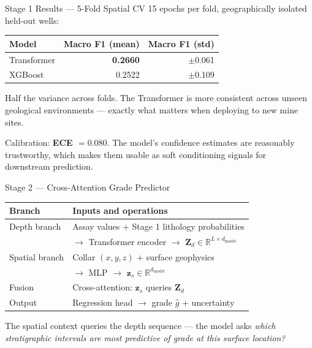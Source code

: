 \documentclass[aspectratio=169,11pt]{beamer}
\newcommand{\acc}[1]{{\color{Accent}#1}}
\newcommand{\dmodel}{d_{\mathrm{model}}}
\begin{document}
\begin{frame}{Stage 1 Results — 5-Fold Spatial CV}
  15 epochs per fold, geographically isolated held-out wells:

  \vspace{0.8em}
  \begin{footnotesize}
  \begin{tabular}{l r r}
    \toprule
    \textbf{Model} & \textbf{Macro F1 (mean)} & \textbf{Macro F1 (std)}\\
    \midrule
    Transformer & \textbf{0.2660} & \acc{$\pm$0.061}\\
    XGBoost     & 0.2522          & $\pm$0.109\\
    \bottomrule
  \end{tabular}
  \end{footnotesize}

  \vspace{1em}
  \acc{Half the variance across folds.} The Transformer is more consistent across unseen geological environments — exactly what matters when deploying to new mine sites.

  \vspace{0.6em}
  Calibration: \textbf{ECE $= 0.080$}. The model's confidence estimates are reasonably trustworthy, which makes them usable as soft conditioning signals for downstream prediction.
\end{frame}

\begin{frame}{Stage 2 — Cross-Attention Grade Predictor}
  \begin{footnotesize}
  \begin{tabular}{ll}
    \toprule
    \textbf{Branch} & \textbf{Inputs and operations}\\
    \midrule
    Depth branch   & Assay values + Stage 1 lithology probabilities\\
                   & $\to$ Transformer encoder $\to$ $\mathbf{Z}_d \in \mathbb{R}^{L \times \dmodel}$\\
    \addlinespace
    Spatial branch & Collar $(x, y, z)$ + surface geophysics\\
                   & $\to$ MLP $\to$ $\mathbf{z}_s \in \mathbb{R}^{\dmodel}$\\
    \addlinespace
    Fusion         & Cross-attention: $\mathbf{z}_s$ queries $\mathbf{Z}_d$\\
    Output         & Regression head $\to$ grade $\hat{g}$ + uncertainty\\
    \bottomrule
  \end{tabular}
  \end{footnotesize}

  \vspace{1em}
  \acc{The spatial context queries the depth sequence} — the model asks \emph{which stratigraphic intervals are most predictive of grade at this surface location?}
\end{frame}
\end{document}
